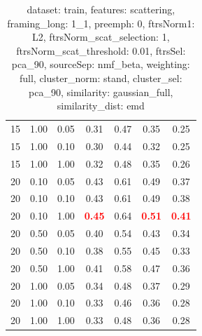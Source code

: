 \documentclass[12pt,a4paper,fleqn]{tufte-handout}
\begin{document}
\begin{table}
\begin{center}
\begin{tabular}{lllcccc}
15 & 1.00 & 0.05 & 0.31 & 0.47 & 0.35 & 0.25 \\      
15 & 1.00 & 0.10 & 0.30 & 0.44 & 0.32 & 0.25 \\      
15 & 1.00 & 1.00 & 0.32 & 0.48 & 0.35 & 0.26 \\      
20 & 0.10 & 0.05 & 0.43 & 0.61 & 0.49 & 0.37 \\      
20 & 0.10 & 0.10 & 0.43 & 0.61 & 0.49 & 0.38 \\      
20 & 0.10 & 1.00 & \textbf{\textcolor{red}{0.45}} & 0.64 & \textbf{\textcolor{red}{0.51}} & \textbf{\textcolor{red}{0.41}} \\      
20 & 0.50 & 0.05 & 0.40 & 0.54 & 0.43 & 0.34 \\      
20 & 0.50 & 0.10 & 0.38 & 0.55 & 0.45 & 0.33 \\      
20 & 0.50 & 1.00 & 0.41 & 0.58 & 0.47 & 0.36 \\      
20 & 1.00 & 0.05 & 0.34 & 0.48 & 0.37 & 0.29 \\      
20 & 1.00 & 0.10 & 0.33 & 0.46 & 0.36 & 0.28 \\      
20 & 1.00 & 1.00 & 0.33 & 0.48 & 0.36 & 0.28 \\      
\end{tabular}      
\end{center}      
\caption{dataset: train, features: scattering, framing\_long: 1\_1, preemph: 0, ftrsNorm1: L2, ftrsNorm\_scat\_selection: 1, ftrsNorm\_scat\_threshold: 0.01, ftrsSel: pca\_90, sourceSep: nmf\_beta, weighting: full, cluster\_norm: stand, cluster\_sel: pca\_90, similarity: gaussian\_full, similarity\_dist: emd}      
\label{datasetrFeaturscFraminlong1_1Preemp0Ftrsnorm1L2Ftrsnoscatselect1Ftrsnoscatthresh0.01Ftrsselpc90SourcesepnmbeWeightfuClustenormstClusteselpc90SimilagafuSimiladistem}      
\end{table}      
 
 
\clearpage     
 
\end{document}
